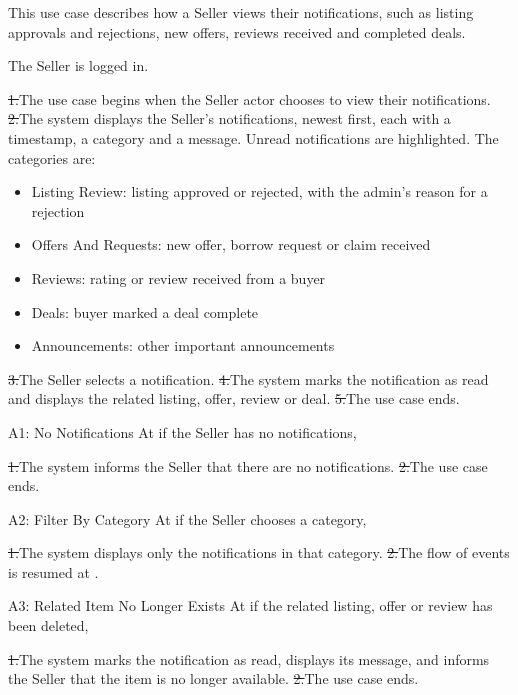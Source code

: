 This use case describes how a Seller views their notifications, such as listing approvals and rejections, new offers, reviews received and completed deals.\par
{}
The Seller is logged in.\par
{}
\st{1.}{The use case begins when the Seller actor chooses to view their notifications.}
\st{2.}{The system displays the Seller's notifications, newest first, each with a timestamp, a category and a message. Unread notifications are highlighted. The categories are:}
\begin{itemize}
  \item Listing Review: listing approved or rejected, with the admin's reason for a rejection
  \item Offers And Requests: new offer, borrow request or claim received
  \item Reviews: rating or review received from a buyer
  \item Deals: buyer marked a deal complete
  \item Announcements: other important announcements
\end{itemize}
\st{3.}{The Seller selects a notification.}
\st{4.}{The system marks the notification as read and displays the related listing, offer, review or deal.}
\st{5.}{The use case ends.}
\begin{flowblock}{A1: No Notifications}
At  if the Seller has no notifications,\par
\st{1.}{The system informs the Seller that there are no notifications.}
\st{2.}{The use case ends.}
\end{flowblock}
\begin{flowblock}{A2: Filter By Category}
At  if the Seller chooses a category,\par
\st{1.}{The system displays only the notifications in that category.}
\st{2.}{The flow of events is resumed at .}
\end{flowblock}
\begin{flowblock}{A3: Related Item No Longer Exists}
At  if the related listing, offer or review has been deleted,\par
\st{1.}{The system marks the notification as read, displays its message, and informs the Seller that the item is no longer available.}
\st{2.}{The use case ends.}
\end{flowblock}

